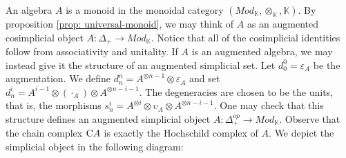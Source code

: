 \documentclass[../thesis.tex]{subfiles}
\begin{document}
            An algebra $A$ is a monoid in the monoidal category $(Mod_\mathbb{K}, \otimes_\mathbb{K}, \mathbb{K})$. By proposition \ref{prop: universal-monoid}, we may think of $A$ as an augmented cosimplicial object $A:\Delta_+ \rightarrow Mod_\mathbb{K}$. Notice that all of the cosimplicial identities follow from associativity and unitality. If $A$ is an augmented algebra, we may instead give it the structure of an augmented simplicial set. Let $d^0_0 = \varepsilon_A$ be the augmentation. We define $d^n_n = A^{\otimes n-1}\otimes\varepsilon_A$ and set $d^i_n = A^{i-1}\otimes (\cdot_A) \otimes A^{\otimes n-i-1}$. The degeneracies are chosen to be the units, that is, the morphisms $s^i_n = A^{\otimes i}\otimes \upsilon_A \otimes A^{\otimes n-i-1}$. One may check that this structure defines an augmented simplicial object $A:\Delta_+^{op}\rightarrow Mod_\mathbb{K}$. Observe that the chain complex $\tt{C}A$ is exactly the Hochschild complex of $A$. We depict the simplicial object in the following diagram:
            \begin{center}

            \end{center}
\end{document}
